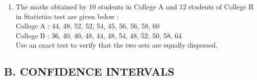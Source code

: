 \documentclass[11pt, a4paper]{article}
\begin{document}
\begin{enumerate}
\begin{table}[h]
\end{table}














\item The marks obtained by 10 students in College A and 12 students of College B in Statistics test are given below : \\

College A : 44, 48, 52, 52, 54, 45, 56, 56, 58, 60 \\

College B : 36, 40, 40, 48, 44, 48, 54, 48, 52, 50, 58, 64 \\

Use an exact test to verify that the two sets are equally dispersed.

















\end{enumerate}































\pagebreak








\begin{center}

\section*{B. CONFIDENCE INTERVALS	}

\end{center}
\end{document}
